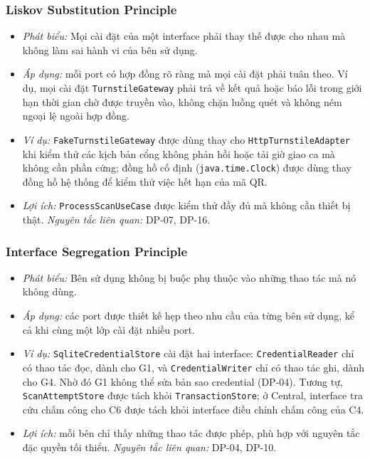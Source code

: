 \subsubsection{Liskov Substitution Principle}\label{sec:solid-lsp}
\begin{itemize}
    \item \textit{Phát biểu:} Mọi cài đặt của một interface phải thay thế được cho nhau mà không làm sai hành vi của bên sử dụng.
    \item \textit{Áp dụng:} mỗi port có hợp đồng rõ ràng mà mọi cài đặt phải tuân theo. Ví dụ, mọi cài đặt \texttt{TurnstileGateway} phải trả về kết quả hoặc báo lỗi trong giới hạn thời gian chờ được truyền vào, không chặn luồng quét và không ném ngoại lệ ngoài hợp đồng.
    \item \textit{Ví dụ:} \texttt{FakeTurnstileGateway} được dùng thay cho \texttt{HttpTurnstileAdapter} khi kiểm thử các kịch bản cổng không phản hồi hoặc tải giờ giao ca mà không cần phần cứng; đồng hồ cố định (\texttt{java.time.Clock}) được dùng thay đồng hồ hệ thống để kiểm thử việc hết hạn của mã QR.
    \item \textit{Lợi ích:} \texttt{ProcessScanUseCase} được kiểm thử đầy đủ mà không cần thiết bị thật. \textit{Nguyên tắc liên quan:} DP-07, DP-16.
\end{itemize}

\subsubsection{Interface Segregation Principle}\label{sec:solid-isp}
\begin{itemize}
    \item \textit{Phát biểu:} Bên sử dụng không bị buộc phụ thuộc vào những thao tác mà nó không dùng.
    \item \textit{Áp dụng:} các port được thiết kế hẹp theo nhu cầu của từng bên sử dụng, kể cả khi cùng một lớp cài đặt nhiều port.
    \item \textit{Ví dụ:} \texttt{SqliteCredentialStore} cài đặt hai interface: \texttt{CredentialReader} chỉ có thao tác đọc, dành cho G1, và \texttt{CredentialWriter} chỉ có thao tác ghi, dành cho G4. Nhờ đó G1 không thể sửa bản sao credential (DP-04). Tương tự, \texttt{ScanAttemptStore} được tách khỏi \texttt{TransactionStore}; ở Central, interface tra cứu chấm công cho C6 được tách khỏi interface điều chỉnh chấm công của C4.
    \item \textit{Lợi ích:} mỗi bên chỉ thấy những thao tác được phép, phù hợp với nguyên tắc đặc quyền tối thiểu. \textit{Nguyên tắc liên quan:} DP-04, DP-10.
\end{itemize}


